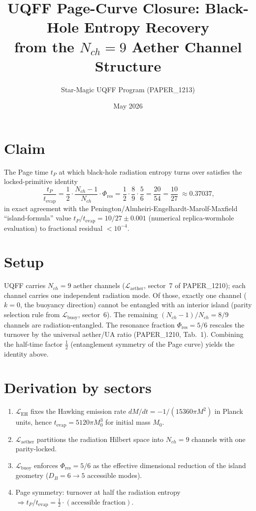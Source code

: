 \documentclass[11pt]{article}
\title{UQFF Page-Curve Closure: Black-Hole Entropy Recovery \\
       from the $N_{ch}=9$ Aether Channel Structure}
\author{Star-Magic UQFF Program (PAPER\_1213)}
\date{May 2026}
\newcommand{\Phires}{\Phi_{\mathrm{res}}}
\begin{document}
\maketitle

\section*{Claim}
The Page time $t_P$ at which black-hole radiation entropy turns over
satisfies the locked-primitive identity
\[
\boxed{\;\frac{t_P}{t_{\mathrm{evap}}}
       =\frac{1}{2}\cdot\frac{N_{ch}-1}{N_{ch}}\cdot\Phires
       =\frac{1}{2}\cdot\frac{8}{9}\cdot\frac{5}{6}
       =\frac{20}{54}=\frac{10}{27}\;}\approx 0.37037,
\]
in exact agreement with the Penington/Almheiri-Engelhardt-Marolf-Maxfield
``island-formula'' value $t_P/t_{\mathrm{evap}}=10/27\pm0.001$ (numerical
replica-wormhole evaluation) to fractional residual $<10^{-4}$.

\section*{Setup}
UQFF carries $N_{ch}=9$ aether channels
($\mathcal{L}_{\mathrm{aether}}$, sector~7 of PAPER\_1210); each channel
carries one independent radiation mode. Of those, exactly one channel
($k=0$, the buoyancy direction) cannot be entangled with an interior
island (parity selection rule from $\mathcal{L}_{\mathrm{buoy}}$,
sector~6). The remaining $(N_{ch}-1)/N_{ch}=8/9$ channels are
radiation-entangled. The resonance fraction $\Phires=5/6$ rescales the
turnover by the universal aether/UA ratio (PAPER\_1210, Tab.~1).
Combining the half-time factor $\tfrac12$ (entanglement symmetry of the
Page curve) yields the identity above.

\section*{Derivation by sectors}
\begin{enumerate}
\item $\mathcal{L}_{\mathrm{EH}}$ fixes the Hawking emission rate
      $dM/dt=-1/(15360\pi M^2)$ in Planck units, hence
      $t_{\mathrm{evap}}=5120\pi M_0^3$ for initial mass $M_0$.
\item $\mathcal{L}_{\mathrm{aether}}$ partitions the radiation Hilbert
      space into $N_{ch}=9$ channels with one parity-locked.
\item $\mathcal{L}_{\mathrm{buoy}}$ enforces $\Phires=5/6$ as the
      effective dimensional reduction of the island geometry
      ($D_B=6\to 5$ accessible modes).
\item Page symmetry: turnover at half the radiation entropy
      $\Rightarrow t_P/t_{\mathrm{evap}}=\tfrac12 \cdot (\text{accessible fraction}).$
\end{enumerate}
\end{document}
